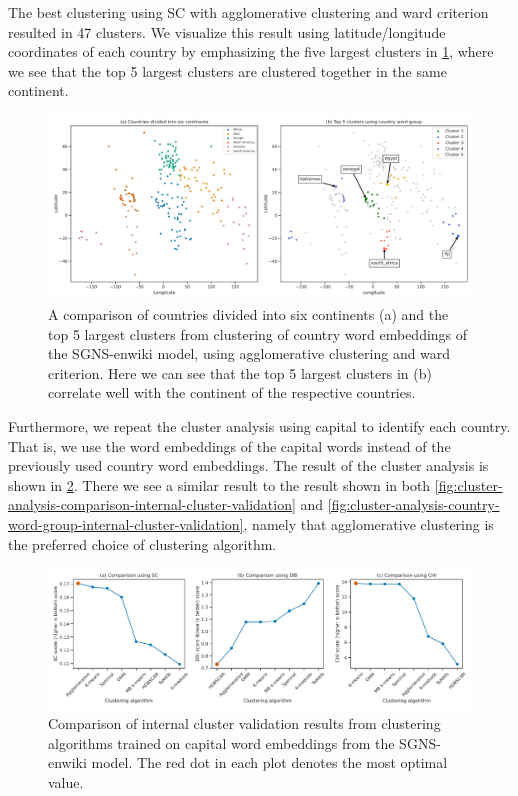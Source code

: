 The best clustering using SC with agglomerative clustering and ward criterion resulted in 47 clusters. We visualize this result using latitude/longitude coordinates of each country by emphasizing the five largest clusters in \cref{fig:cluster-analysis-agglomerative-country-word-group-top-clusters}, where we see that the top 5 largest clusters are clustered together in the same continent.
\begin{figure}[H]
    \centering
    \includegraphics[width=\textwidth]{thesis/figures/cluster-analysis-agglomerative-country-word-group-top-clusters.pdf}
    \caption{A comparison of countries divided into six continents (a) and the top 5 largest clusters from clustering of country word embeddings of the SGNS-enwiki model, using agglomerative clustering and ward criterion. Here we can see that the top 5 largest clusters in (b) correlate well with the continent of the respective countries.}
    \label{fig:cluster-analysis-agglomerative-country-word-group-top-clusters}
\end{figure}

Furthermore, we repeat the cluster analysis using capital to identify each country. That is, we use the word embeddings of the capital words instead of the previously used country word embeddings. The result of the cluster analysis is shown in \cref{fig:cluster-analysis-country-capitals-word-group-internal-cluster-validation}. There we see a similar result to the result shown in both \cref{fig:cluster-analysis-comparison-internal-cluster-validation} and \cref{fig:cluster-analysis-country-word-group-internal-cluster-validation}, namely that agglomerative clustering is the preferred choice of clustering algorithm.
\begin{figure}[H]
    \centering
    \includegraphics[width=\textwidth]{thesis/figures/cluster-analysis-country-capitals-word-group-internal-cluster-validation.pdf}
    \caption{Comparison of internal cluster validation results from clustering algorithms trained on capital word embeddings from the SGNS-enwiki model. The red dot in each plot denotes the most optimal value.}
    \label{fig:cluster-analysis-country-capitals-word-group-internal-cluster-validation}
\end{figure}

